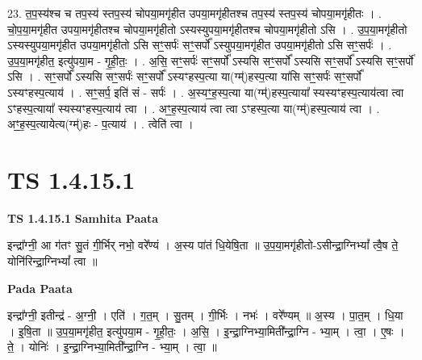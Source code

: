 \documentclass[17pt]{extarticle}
\begin{document}
23. त॒प॒स्य॑श्च च तप॒स्य॑ स्तप॒स्य॑ चोपया॒मगृ॑हीत उपया॒मगृ॑हीतश्च तप॒स्य॑ स्तप॒स्य॑ चोपया॒मगृ॑हीतः । . चो॒प॒या॒मगृ॑हीत उपया॒मगृ॑हीतश्च चोपया॒मगृ॑हीतो ऽस्यस्युपया॒मगृ॑हीतश्च चोपया॒मगृ॑हीतो ऽसि । . उ॒प॒या॒मगृ॑हीतो ऽस्यस्युपया॒मगृ॑हीत उपया॒मगृ॑हीतो ऽसि सꣳ॒॒सर्पः॑ सꣳ॒॒सर्पो᳚ ऽस्युपया॒मगृ॑हीत उपया॒मगृ॑हीतो ऽसि सꣳ॒॒सर्पः॑ । . उ॒प॒या॒मगृ॑हीत॒ इत्यु॑पया॒म - गृ॒ही॒तः॒ । . अ॒सि॒ सꣳ॒॒सर्पः॑ सꣳ॒॒सर्पो᳚ ऽस्यसि सꣳ॒॒सर्पो᳚ ऽस्यसि सꣳ॒॒सर्पो᳚ ऽस्यसि सꣳ॒॒सर्पो॑ ऽसि । . सꣳ॒॒सर्पो᳚ ऽस्यसि सꣳ॒॒सर्पः॑ सꣳ॒॒सर्पो᳚ ऽस्यꣳहस्प॒त्या या(ग्म्॑)हस्प॒त्या या॑सि सꣳ॒॒सर्पः॑ सꣳ॒॒सर्पो᳚ ऽस्यꣳहस्प॒त्याय॑ । . सꣳ॒॒सर्प॒ इति॑ सं - सर्पः॑ । . अ॒स्यꣳ॒॒ह॒स्प॒त्या या(ग्म्॑)हस्प॒त्याया᳚ स्यस्यꣳहस्प॒त्याय॑त्वा त्वा ऽꣳहस्प॒त्याया᳚ स्यस्यꣳहस्प॒त्याय॑ त्वा । . अꣳ॒॒ह॒स्प॒त्याय॑ त्वा त्वा ऽꣳहस्प॒त्या या(ग्म्॑)हस्प॒त्याय॑ त्वा । . अꣳ॒॒ह॒स्प॒त्यायेत्य(ग्म्॑)हः - प॒त्याय॑ । . त्वेति॑ त्वा । \newline
\pagebreak
{}

\section{ TS 1.4.15.1 }

\textbf{TS 1.4.15.1 } \newline
\textbf{Samhita Paata} \newline

इन्द्रा᳚ग्नी॒ आ ग॑तꣳ सु॒तं गी॒र्भिर् नभो॒ वरे᳚ण्यं । अ॒स्य पा॑तं धि॒येषि॒ता ॥ उ॒प॒या॒मगृ॑हीतो-ऽसीन्द्रा॒ग्निभ्यां᳚ त्वै॒ष ते॒ योनि॑रिन्द्रा॒ग्निभ्यां᳚ त्वा ॥ \newline

\textbf{Pada Paata} \newline

इन्द्रा᳚ग्नी॒ इतीन्द्र॑ - अ॒ग्नी॒ । एति॑ । ग॒त॒म् । सु॒तम् । गी॒र्भिः । नभः॑ । वरे᳚ण्यम् ॥ अ॒स्य । पा॒त॒म् । धि॒या । इ॒षि॒ता ॥ उ॒प॒या॒मगृ॑हीत॒ इत्यु॑पया॒म - गृ॒ही॒तः॒ । अ॒सि॒ । इ॒न्द्रा॒ग्निभ्या॒मिती᳚न्द्रा॒ग्नि - भ्या॒म् । त्वा॒ । ए॒षः । ते॒ । योनिः॑ । इ॒न्द्रा॒ग्निभ्या॒मिती᳚न्द्रा॒ग्नि - भ्या॒म् । त्वा॒ ॥  \newline
\end{document}
